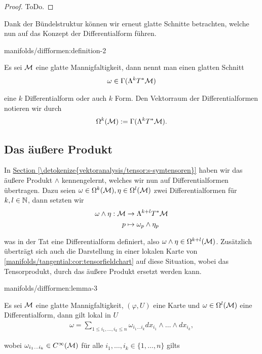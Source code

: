 \begin{proof}
 ToDo.
\end{proof}

\par
Dank der Bündelstruktur können wir erneut glatte Schnitte betrachten, welche nun auf das Konzept der Differentialform führen.
\begin{definition}{}{manifolds/diffformen:definition-2}



\par
Es sei \(\mathcal{M}\) eine glatte Mannigfaltigkeit, dann nennt man einen glatten Schnitt
\begin{align*}
\omega\in \Gamma(\Lambda^k T^\ast\mathcal{M})
\end{align*}
\par
eine \(k\) Differentialform oder auch \(k\) Form. Den Vektorraum der Differentialformen notieren wir durch
\begin{align*}
\Omega^k(\mathcal{M}) := \Gamma(\Lambda^k T^\ast\mathcal{M}).
\end{align*}\end{definition}


\subsection{Das äußere Produkt}
\label{\detokenize{manifolds/diffformen:das-auszere-produkt}}
\par
In \hyperref[\detokenize{vektoranalysis/tensor:s-symtensoren}]{Section \ref{\detokenize{vektoranalysis/tensor:s-symtensoren}}} haben wir das äußere Produkt \(\wedge\) kennengelernt, welches wir nun auf Differentialformen übertragen. Dazu seien \(\omega\in \Omega^k(\mathcal{M}), \eta\in \Omega^l(\mathcal{M})\) zwei Differentialformen für \(k,l\in\mathbb{N}\), dann setzten wir
\begin{align*}
\omega \wedge \eta:\mathcal{M} &\to \Lambda^{k+l}T^\ast\mathcal{M}\\
p&\mapsto \omega_p \wedge \eta_p
\end{align*}
\par
was in der Tat eine Differentialform definiert, also \(\omega\wedge\eta \in \Omega^{k+l}(\mathcal{M})\). Zusätzlich überträgt sich auch die Darstellung in einer lokalen Karte von \cref{manifolds/tangential:cor:tensorfieldchart} auf diese Situation, wobei das Tensorprodukt, durch das äußere Produkt ersetzt werden kann.
\begin{lemma}{}{manifolds/diffformen:lemma-3}



\par
Es sei \(\mathcal{M}\) eine glatte Mannigfaltigkeit, \((\varphi,U)\) eine Karte und \(\omega\in\Omega^l(\mathcal{M})\) eine Differentialform, dann gilt lokal in \(U\)
\begin{align*}
\omega = \sum_{1\leq i_1,\ldots,i_k \leq n}\omega_{i_1\ldots i_k}
dx_{i_1}\wedge\ldots\wedge dx_{i_k},
\end{align*}
\par
wobei \(\omega_{i_1\ldots i_k}\in C^\infty(\mathcal{M})\) für alle \(i_1,\ldots,i_k\in\{1,\ldots,n\}\) gilts
\end{lemma}

